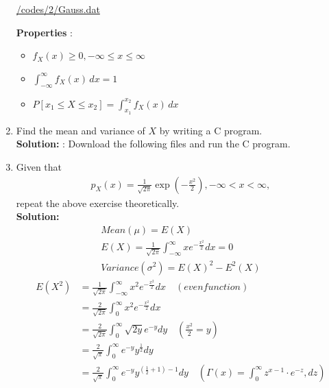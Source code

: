 \documentclass[12pt]{book}
\providecommand{\brak}[1]{\ensuremath{\left(#1\right)}}
\newcommand{\solution}{\noindent \textbf{Solution: }}
\begin{document}
\begin{enumerate}
\begin{center}
{{\href{https://github.com/Gangagopinath/ASSIGNMENT/tree/main/digitalcommunication/codes/2/Gauss.dat}
{/codes/2/Gauss.dat}}}
\end{center}
\textbf{Properties} : 
\begin{itemize}
\item $f_X(x) \ge 0 ,{-\infty \leq x \leq \infty}$
\item $\int_{-\infty}^{\infty} f_X(x) \,dx = 1$
\item $P[{x_1 \leq X \leq x_2}] =\int_{x_1}^{x_2} f_X(x) \,dx $
\end{itemize}
\item Find the mean and variance of $X$ by writing a C program.\\
\solution : Download the following files and run the  C program.
\begin{center}
\end{center}
\item Given that 
\begin{align}
p_{X}(x) = \frac{1}{\sqrt{2\pi}}\exp\brak{-\frac{x^2}{2}}, -\infty < x < \infty,
\end{align}
repeat the above exercise theoretically.\\
\solution
\begin{align}
Mean(\mu) = E(X)\\
E(X)= \frac{1}{\sqrt{2\pi}} \int_{-\infty}^{\infty} x e^{-\frac{x^2}{2}}dx=0 \\
Variance( \sigma^2) =  E\brak X^2 - E^2\brak X 
\end{align}
\begin{align}
    E\brak{X^2}&= \frac{1}{\sqrt{2\pi}}\int_{-\infty}^{\infty} x^2
e^ {-\frac{x^2}{2}} dx \quad \brak{even function}\\
    &= \frac{2}{\sqrt{2\pi}} \int_{0}^{\infty} x^2 e^{-\frac{x^2}{2}} dx\\
    &= \frac{2}{\sqrt{2\pi}}\int_{0}^{\infty}\sqrt{2y}e^{-y} dy \quad\brak{ \frac{x^2}{2}= y}\\
        &= \frac{2}{\sqrt{\pi}} \int_{0}^{\infty} e^{-y} y^{\frac{1}{2}} dy\\
    &= \frac{2}{\sqrt{\pi}} \int_{0}^{\infty} e^{-y} y^{(\frac{1}{2}+1)-1} dy \quad\brak{\Gamma(x) = \int_{0}^{\infty} z^{x-1} \cdot e^{-z} , dz}\\

\end{align}
\end{enumerate}
\end{document}
